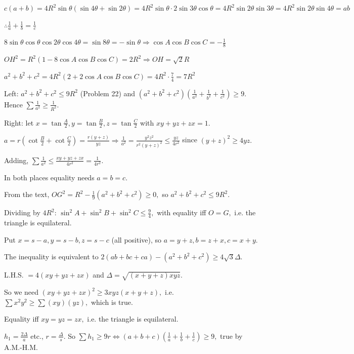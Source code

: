   $c(a + b) = 4R^2\sin\theta(\sin 4\theta + \sin 2\theta) = 4R^2\sin\theta\cdot 2\sin 3\theta\cos\theta = 4R^2\sin 2\theta\sin
  3\theta = 4R^2\sin 2\theta\sin 4\theta = ab$

  $\therefore \frac{1}{a} + \frac{1}{b} = \frac{1}{c}$

  $8\sin\theta\cos\theta\cos 2\theta\cos 4\theta = \sin 8\theta = -\sin\theta\Rightarrow \cos A\cos B\cos C = -\frac{1}{8}$

  $OH^2 = R^2(1 - 8\cos A\cos B\cos C) = 2R^2\Rightarrow OH = \sqrt{2}R$

  $a^2 + b^2 + c^2 = 4R^2(2 + 2\cos A\cos B\cos C) = 4R^2\cdot\frac{7}{4} = 7R^2$
\item Left: $a^2 + b^2 + c^2\leq 9R^2$ (Problem 22) and $(a^2 + b^2 + c^2)\left(\frac{1}{a^2} + \frac{1}{b^2} +
  \frac{1}{c^2}\right)\geq 9.$ Hence $\sum\frac{1}{a^2}\geq \frac{1}{R^2}.$

  Right: let $x = \tan\frac{A}{2}, y = \tan\frac{B}{2}, z = \tan\frac{C}{2}$ with $xy + yz + zx = 1.$

  $a = r\left(\cot\frac{B}{2} + \cot\frac{C}{2}\right) = \frac{r(y + z)}{yz}\Rightarrow \frac{1}{a^2} =
  \frac{y^2z^2}{r^2(y + z)^2}\leq \frac{yz}{4r^2}$ since $(y + z)^2\geq 4yz.$

  Adding, $\sum\frac{1}{a^2}\leq \frac{xy + yz + zx}{4r^2} = \frac{1}{4r^2}.$

  In both places equality needs $a = b = c.$
\item From the text, $OG^2 = R^2 - \frac{1}{9}(a^2 + b^2 + c^2)\geq 0,$ so $a^2 + b^2 + c^2\leq 9R^2.$

  Dividing by $4R^2$: $\sin^2A + \sin^2B + \sin^2C\leq \frac{9}{4},$ with equality iff $O = G,$ i.e. the triangle is
  equilateral.
\item Put $x = s - a, y = s - b, z = s - c$ (all positive), so $a = y + z, b = z + x, c = x + y.$

  The inequality is equivalent to $2(ab + bc + ca) - (a^2 + b^2 + c^2)\geq 4\sqrt{3}\Delta.$

  L.H.S. $= 4(xy + yz + zx)$ and $\Delta = \sqrt{(x + y + z)xyz}.$

  So we need $(xy + yz + zx)^2\geq 3xyz(x + y + z),$ i.e. $\sum x^2y^2\geq \sum (xy)(yz),$ which is true.

  Equality iff $xy = yz = zx,$ i.e. the triangle is equilateral.
\item $h_1 = \frac{2\Delta}{a}$ etc., $r = \frac{\Delta}{s}.$ So $\sum h_1\geq 9r \iff (a + b + c)\left(\frac{1}{a} +
  \frac{1}{b} + \frac{1}{c}\right)\geq 9,$ true by A.M.-H.M.

